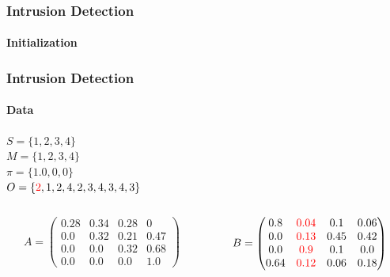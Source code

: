 \documentclass{beamer}
\begin{document}
\begin{frame}
  \frametitle{Intrusion Detection}
  \framesubtitle{Initialization}
\end{frame}

\begin{frame}
  \frametitle{Intrusion Detection}
  \framesubtitle{Data}
  $S = \{1,2,3,4\}$\\
  $M = \{1,2,3,4\}$\\
  $\pi = \{1.0,0,0\}$\\
  $O = \{\textcolor{red}{2},1,2,4,2,3,4,3,4,3\}$
  \begin{columns}[T]
    \begin{column}{.45\textwidth}
      $$
      A = \begin{pmatrix}
        0.28 & 0.34 & 0.28 & 0\\
        0.0 & 0.32 & 0.21 & 0.47\\
        0.0 & 0.0 & 0.32 & 0.68\\
        0.0 & 0.0 & 0.0 & 1.0
      \end{pmatrix}
      $$
    \end{column}
    \begin{column}{.45\textwidth}
      $$
      B = \begin{pmatrix}
        0.8 & \textcolor{red}{0.04} & 0.1 & 0.06\\
        0.0 & \textcolor{red}{0.13} & 0.45 & 0.42\\
        0.0 & \textcolor{red}{0.9} & 0.1 & 0.0\\
        0.64 & \textcolor{red}{0.12} & 0.06 & 0.18\\
      \end{pmatrix}
      $$
    \end{column}
  \end{columns}
\end{frame}
\end{document}
